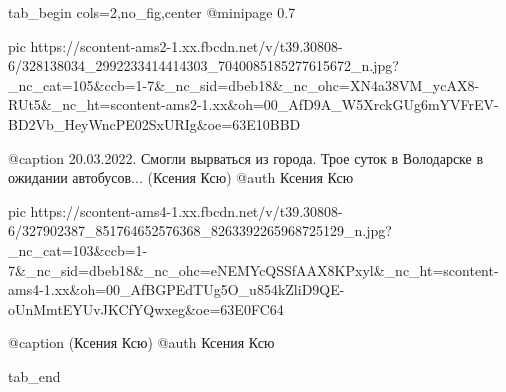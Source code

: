  
 
 
 
 

\begin{center}
\begin{minipage}{\textwidth}

\ifcmt
  tab_begin cols=2,no_fig,center
     @minipage 0.7

     pic https://scontent-ams2-1.xx.fbcdn.net/v/t39.30808-6/328138034_2992233414414303_7040085185277615672_n.jpg?_nc_cat=105&ccb=1-7&_nc_sid=dbeb18&_nc_ohc=XN4a38VM_ycAX8-RUt5&_nc_ht=scontent-ams2-1.xx&oh=00_AfD9A_W5XrckGUg6mYVFrEV-BD2Vb_HeyWncPE02SxURIg&oe=63E10BBD

     @caption 20.03.2022. Смогли вырваться из города. Трое суток в Володарске в ожидании автобусов... (Ксения Ксю)
     @auth Ксения Ксю

     pic https://scontent-ams4-1.xx.fbcdn.net/v/t39.30808-6/327902387_851764652576368_8263392265968725129_n.jpg?_nc_cat=103&ccb=1-7&_nc_sid=dbeb18&_nc_ohc=eNEMYcQSSfAAX8KPxyl&_nc_ht=scontent-ams4-1.xx&oh=00_AfBGPEdTUg5O_u854kZliD9QE-oUnMmtEYUvJKCfYQwxeg&oe=63E0FC64

     @caption (Ксения Ксю)
     @auth Ксения Ксю

  tab_end
\fi
\end{minipage}
\end{center}

